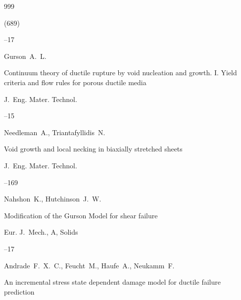\begin{thebibliography}{999}

 (689)

--17




\by Gurson~A.~L. 

\paper Continuum theory of ductile rupture by void nucleation and growth. I. Yield criteria and flow rules for porous ductile media

\jour J.~Eng. Mater. Technol.  




–15






\by Needleman~A., Triantafyllidis~N. 

\paper Void growth and local necking in biaxially stretched sheets

\jour J.~Eng. Mater. Technol.




--169






\by Nahshon~K., Hutchinson~J.~W. 

\paper Modification of the Gurson Model for shear failure

\jour Eur. J.~Mech., A, Solids




--17






\by Andrade~F.~X.~C., Feucht~M., Haufe~A., Neukamm~F. 

\paper An incremental stress state dependent damage model for ductile failure prediction


\end{thebibliography}
